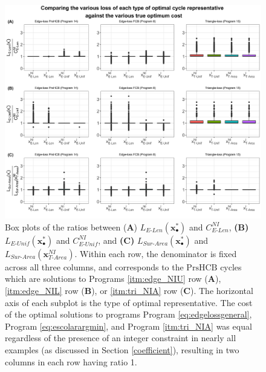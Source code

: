 \documentclass[11pt,onecolumn]{article}
\newcommand{\optimalrep}{\mathbf{x}}
\newcommand{\se}{Section }
\newcommand{\NI}{^{NI}}
\newcommand{\setofpersistenthcyclebases}{\mathrm{PrsHCB}}
\newcommand{\pr}{Program }
\newcommand{\EU}{_{E\text{-}Unif}}
\newcommand{\EL}{_{E\text{-}Len}}
\newcommand{\TA}{_{T\text{-}Area}}
\theoremstyle{plain}
\theoremstyle{definition}
\begin{document}
 
 \begin{figure}[h!]
\begin{center}
\includegraphics[width=\textwidth]{figures/length_area_edge.jpg}
\end{center}
\caption{Box plots of the ratios between (\textbf{A}) $L\EL(\optimalrep_\bullet^*)$ and $C\EL\NI$,  \textbf{(B)} $L\EU(\optimalrep_\bullet^*)$ and $C\EU\NI$, and  \textbf{(C)} $L_{Sur\text{-}Area}(\optimalrep_\bullet^*)$ and $L_{Sur\text{-}Area}(\optimalrep \TA\NI)$. 
Within each row, the denominator is fixed across all three columns, and corresponds to the $\setofpersistenthcyclebases$ cycles which are solutions to Programs \ref{itm:edge_NIU} row (\textbf{A}), \ref{itm:edge_NIL} row (\textbf{B}), or \ref{itm:tri_NIA} row (\textbf{C}).
The horizontal axis of each subplot is the type of optimal representative.
The cost of the optimal solutions to programs
\pr \eqref{eq:edgelossgeneral}, \pr \eqref{eq:escolarargmin}, and \pr \ref{itm:tri_NIA} was equal regardless of the presence of an integer constraint in nearly all examples (as discussed in \se \ref{coefficient}), resulting in two columns in each row having ratio 1. 
}
\end{figure}
\end{document}
